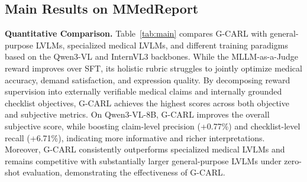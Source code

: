 \documentclass[letterpaper]{article} %
\begin{document}
\begin{table}[t]
\centering
\renewcommand{\arraystretch}{0.85}
\caption{Ablation study of reward designs in G-CARL.}
\vspace{-8pt}
\label{tab:tab2}
\setlength{\tabcolsep}{2.8pt}
\vspace{-18pt}
\end{table}


\subsection{Main Results on MMedReport}
\noindent \textbf{Quantitative Comparison.}
Table~\ref{tab:main} compares G-CARL with general-purpose LVLMs, specialized medical LVLMs, and different training paradigms based on the Qwen3-VL and InternVL3 backbones. 
While the MLLM-as-a-Judge reward improves over SFT, its holistic rubric struggles to jointly optimize medical accuracy, demand satisfaction, and expression quality. 
By decomposing reward supervision into externally verifiable medical claims and internally grounded checklist objectives, G-CARL achieves the highest scores across both objective and subjective metrics. 
On Qwen3-VL-8B, G-CARL improves the overall subjective score, while boosting claim-level precision (+0.77\%) and checklist-level recall (+6.71\%), 
indicating more informative and richer interpretations. 
Moreover, G-CARL consistently outperforms specialized medical LVLMs and remains competitive with substantially larger general-purpose LVLMs under zero-shot evaluation, demonstrating the effectiveness of G-CARL.
\end{document}
